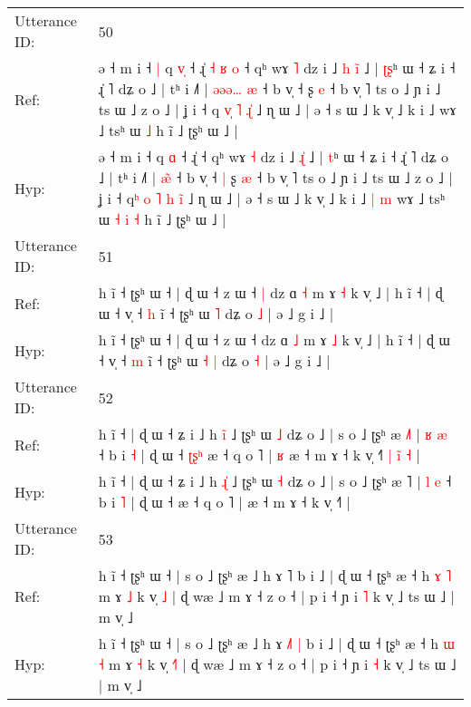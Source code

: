 \documentclass[10pt]{article}
\DeclareRobustCommand{\hl}[1]{{\textcolor{red}{#1}}}
\begin{document}
\begin{longtable}{ll}
 \\
\midrule
Utterance ID: & 50 \\
Ref: & ə ˧ m i ˧\hl{ }\hl{|} q \hl{v}\hl{̩} ˧ ɻ̍\hl{ }\hl{˧}\hl{ }\hl{ʁ}\hl{ }\hl{o} ˧ qʰ wɤ \hl{˥} dz i ˩\hl{ }\hl{h} \hl{i}\hl{̃} ˩ | \hl{ʈ}\hl{ʂ}ʰ ɯ ˧ ʑ i ˧ ɻ̍ ˥ dʑ o ˩ | tʰ i ˩˥ | \hl{ə}\hl{ə}\hl{ə}\hl{…}\hl{ }\hl{æ} ˧ b v̩ ˧\hl{}\hl{} ʂ \hl{e} ˧ b v̩ ˥ ts o ˩ ɲ i ˩ ts ɯ ˩ z o ˩ | ʝ i ˧ q\hl{} \hl{}\hl{v}\hl{̩} \hl{˥} \hl{ɻ}\hl{̍} ˩ ɳ ɯ ˩ | ə ˧ s ɯ ˩ k v̩ ˩ k i ˩\hl{}\hl{}\hl{}\hl{} wɤ ˩ tsʰ ɯ\hl{}\hl{}\hl{}\hl{} \hl{˩} h ĩ ˩ ʈʂʰ ɯ ˩ |
 \\
Hyp: & ə ˧ m i ˧\hl{}\hl{} q \hl{}\hl{ɑ} ˧ ɻ̍\hl{}\hl{}\hl{}\hl{}\hl{}\hl{} ˧ qʰ wɤ \hl{˧} dz i ˩\hl{}\hl{} \hl{ɻ}\hl{̍} ˩ | \hl{}\hl{t}ʰ ɯ ˧ ʑ i ˧ ɻ̍ ˥ dʑ o ˩ | tʰ i ˩˥ | \hl{}\hl{}\hl{}\hl{}\hl{æ}\hl{̃} ˧ b v̩ ˧\hl{ }\hl{|} ʂ \hl{æ} ˧ b v̩ ˥ ts o ˩ ɲ i ˩ ts ɯ ˩ z o ˩ | ʝ i ˧ q\hl{ʰ} \hl{o}\hl{ }\hl{˥} \hl{h} \hl{i}\hl{̃} ˩ ɳ ɯ ˩ | ə ˧ s ɯ ˩ k v̩ ˩ k i ˩\hl{ }\hl{|}\hl{ }\hl{m} wɤ ˩ tsʰ ɯ\hl{ }\hl{˧}\hl{ }\hl{i} \hl{˧} h ĩ ˩ ʈʂʰ ɯ ˩ |
 \\
\midrule
Utterance ID: & 51 \\
Ref: & h ĩ ˧ ʈʂʰ ɯ ˧ | ɖ ɯ ˧ z ɯ ˧\hl{ }\hl{|} dz ɑ \hl{˧} m ɤ \hl{˧} k v̩ ˩ | h ĩ ˧ | ɖ ɯ ˧ v̩ ˧ \hl{h} ĩ ˧ ʈʂʰ ɯ\hl{}\hl{} \hl{˥} dʑ o \hl{˩} | ə ˩ g i ˩ |
 \\
Hyp: & h ĩ ˧ ʈʂʰ ɯ ˧ | ɖ ɯ ˧ z ɯ ˧\hl{}\hl{} dz ɑ \hl{˩} m ɤ \hl{˩} k v̩ ˩ | h ĩ ˧ | ɖ ɯ ˧ v̩ ˧ \hl{m} ĩ ˧ ʈʂʰ ɯ\hl{ }\hl{˧} \hl{|} dʑ o \hl{˧} | ə ˩ g i ˩ |
 \\
\midrule
Utterance ID: & 52 \\
Ref: & h ĩ ˧ | ɖ ɯ ˧ ʑ i ˩ h \hl{i}\hl{̃} ˩ ʈʂʰ ɯ \hl{˩} dʑ o ˩ | s o ˩ ʈʂʰ æ \hl{˩}˥ | \hl{ʁ} \hl{æ} ˧ b i \hl{˧} | ɖ ɯ ˧\hl{ }\hl{ʈ}\hl{ʂ}\hl{ʰ} æ ˧ q o ˥ |\hl{ }\hl{ʁ} æ ˧ m ɤ ˧ k v̩ ˧˥\hl{ }\hl{|}\hl{ }\hl{i}\hl{̃}\hl{ }\hl{˧} |
 \\
Hyp: & h ĩ ˧ | ɖ ɯ ˧ ʑ i ˩ h \hl{ɻ}\hl{̍} ˩ ʈʂʰ ɯ \hl{˧} dʑ o ˩ | s o ˩ ʈʂʰ æ \hl{}˥ | \hl{l} \hl{e} ˧ b i \hl{˥} | ɖ ɯ ˧\hl{}\hl{}\hl{}\hl{} æ ˧ q o ˥ |\hl{}\hl{} æ ˧ m ɤ ˧ k v̩ ˧˥\hl{}\hl{}\hl{}\hl{}\hl{}\hl{}\hl{} |
 \\
\midrule
Utterance ID: & 53 \\
Ref: & h ĩ ˧ ʈʂʰ ɯ ˧ | s o ˩ ʈʂʰ æ ˩ h ɤ \hl{}˥\hl{}\hl{} b i ˩ | ɖ ɯ ˧ ʈʂʰ æ ˧ h \hl{ɤ} \hl{˥} m ɤ \hl{˩} k v̩ \hl{}\hl{˩} | ɖ wæ ˩ m ɤ ˧ z o ˧ | p i ˧ ɲ i \hl{˥} k v̩ ˩ ts ɯ ˩ | m v̩ ˩
 \\
Hyp: & h ĩ ˧ ʈʂʰ ɯ ˧ | s o ˩ ʈʂʰ æ ˩ h ɤ \hl{˩}˥\hl{ }\hl{|} b i ˩ | ɖ ɯ ˧ ʈʂʰ æ ˧ h \hl{ɯ} \hl{˧} m ɤ \hl{˧} k v̩ \hl{˧}\hl{˥} | ɖ wæ ˩ m ɤ ˧ z o ˧ | p i ˧ ɲ i \hl{˧} k v̩ ˩ ts ɯ ˩ | m v̩ ˩

\end{longtable}
\end{document}
